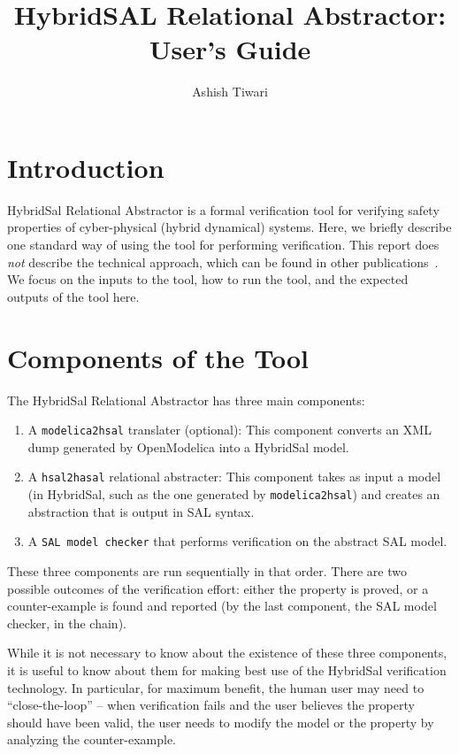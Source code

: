 \documentclass{article}
\begin{document}
\title{HybridSAL Relational Abstractor: User's Guide}
\author{Ashish Tiwari}

\maketitle

\section{Introduction}

HybridSal Relational Abstractor is a formal verification tool for
verifying safety properties of cyber-physical (hybrid dynamical) systems.
Here, we briefly describe one standard way of using the tool for 
performing verification.  This report does {\em{not}} describe the
technical approach, which can be found in other publications~\cite{ST11:CAV,hsalrelabs,ZST12:CAV}.
We focus on the inputs to the tool, how to run the tool, and the 
expected outputs of the tool here.

\section{Components of the Tool}

The HybridSal Relational Abstractor has three main components:
\begin{enumerate}
\item
 A {\tt{modelica2hsal}} translater (optional):
 This component converts an XML dump generated by OpenModelica into a HybridSal model.
\item
 A {\tt{hsal2hasal}} relational abstracter:
 This component takes as input a model (in HybridSal, such as the one generated by 
 {\tt{modelica2hsal}}) and creates an abstraction that is output in SAL syntax.
\item
 A {\tt{SAL model checker}} that performs verification on the abstract SAL model.
\end{enumerate}

These three components are run sequentially in that order. 
There are two possible outcomes of the verification effort:
either the property is proved, or a counter-example is found and reported
(by the last component, the SAL model checker, in the chain).

While it is not necessary to know about the existence of these three components,
it is useful to know about them for making best use of the HybridSal verification
technology.  In particular, for maximum benefit, the human user may need to 
``close-the-loop'' -- when verification fails and the user believes the property
should have been valid, the user needs to modify the model or the property by
analyzing the counter-example.
\end{document}
